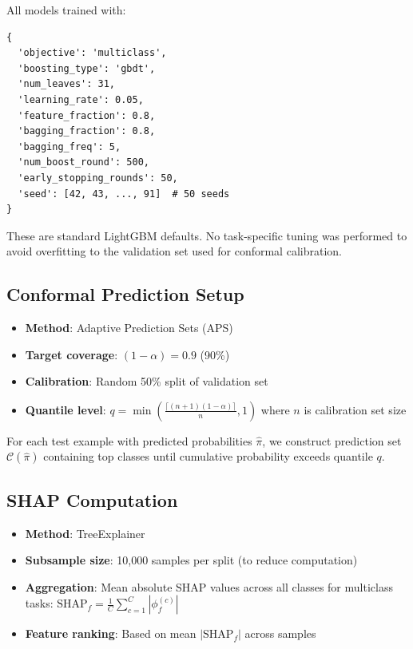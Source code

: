 All models trained with:

\begin{verbatim}
{
  'objective': 'multiclass',
  'boosting_type': 'gbdt',
  'num_leaves': 31,
  'learning_rate': 0.05,
  'feature_fraction': 0.8,
  'bagging_fraction': 0.8,
  'bagging_freq': 5,
  'num_boost_round': 500,
  'early_stopping_rounds': 50,
  'seed': [42, 43, ..., 91]  # 50 seeds
}
\end{verbatim}

These are standard LightGBM defaults. No task-specific tuning was performed to
avoid overfitting to the validation set used for conformal calibration.

\subsection{Conformal Prediction Setup}

\begin{itemize}
    \item \textbf{Method}: Adaptive Prediction Sets (APS)~\cite{romano2020classification}
    \item \textbf{Target coverage}: $(1-\alpha) = 0.9$ (90\%)
    \item \textbf{Calibration}: Random 50\% split of validation set
    \item \textbf{Quantile level}: $q = \min\left(\frac{\lceil(n+1)(1-\alpha)\rceil}{n}, 1\right)$
    where $n$ is calibration set size
\end{itemize}

For each test example with predicted probabilities $\hat{\pi}$, we construct
prediction set $\mathcal{C}(\hat{\pi})$ containing top classes until cumulative
probability exceeds quantile $q$.

\subsection{SHAP Computation}

\begin{itemize}
    \item \textbf{Method}: TreeExplainer~\cite{lundberg2020local}
    \item \textbf{Subsample size}: 10,000 samples per split (to reduce computation)
    \item \textbf{Aggregation}: Mean absolute SHAP values across all classes for
    multiclass tasks: $\text{SHAP}_f = \frac{1}{C} \sum_{c=1}^C |\phi_f^{(c)}|$
    \item \textbf{Feature ranking}: Based on mean $|\text{SHAP}_f|$ across samples
\end{itemize}

